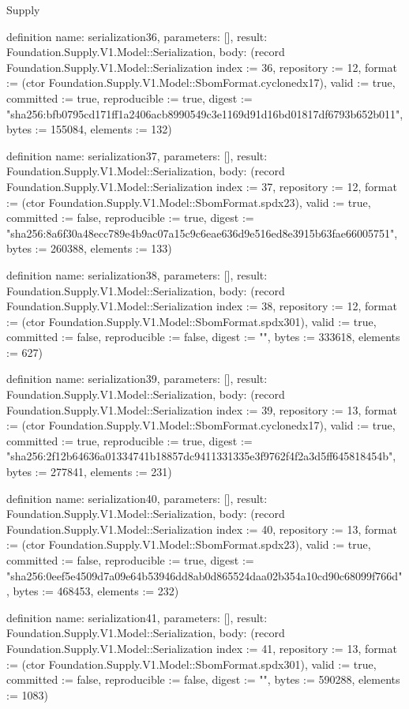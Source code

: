 \begin{lexlean}{Supply}
\begin{semanticmodule}
definition{
  name: serialization36,
  parameters: [],
  result: Foundation.Supply.V1.Model::Serialization,
  body: (record Foundation.Supply.V1.Model::Serialization {index := 36, repository := 12, format := (ctor Foundation.Supply.V1.Model::SbomFormat.cyclonedx17), valid := true, committed := true, reproducible := true, digest := "sha256:bfb0795cd171ff1a2406acb8990549c3e1169d91d16bd01817df6793b652b011", bytes := 155084, elements := 132})
}

definition{
  name: serialization37,
  parameters: [],
  result: Foundation.Supply.V1.Model::Serialization,
  body: (record Foundation.Supply.V1.Model::Serialization {index := 37, repository := 12, format := (ctor Foundation.Supply.V1.Model::SbomFormat.spdx23), valid := true, committed := false, reproducible := true, digest := "sha256:8a6f30a48ecc789e4b9ac07a15c9c6eae636d9e516ed8e3915b63fae66005751", bytes := 260388, elements := 133})
}

definition{
  name: serialization38,
  parameters: [],
  result: Foundation.Supply.V1.Model::Serialization,
  body: (record Foundation.Supply.V1.Model::Serialization {index := 38, repository := 12, format := (ctor Foundation.Supply.V1.Model::SbomFormat.spdx301), valid := true, committed := false, reproducible := false, digest := "", bytes := 333618, elements := 627})
}

definition{
  name: serialization39,
  parameters: [],
  result: Foundation.Supply.V1.Model::Serialization,
  body: (record Foundation.Supply.V1.Model::Serialization {index := 39, repository := 13, format := (ctor Foundation.Supply.V1.Model::SbomFormat.cyclonedx17), valid := true, committed := true, reproducible := true, digest := "sha256:2f12b64636a01334741b18857dc9411331335e3f9762f4f2a3d5ff645818454b", bytes := 277841, elements := 231})
}

definition{
  name: serialization40,
  parameters: [],
  result: Foundation.Supply.V1.Model::Serialization,
  body: (record Foundation.Supply.V1.Model::Serialization {index := 40, repository := 13, format := (ctor Foundation.Supply.V1.Model::SbomFormat.spdx23), valid := true, committed := false, reproducible := true, digest := "sha256:0eef5e4509d7a09e64b53946dd8ab0d865524daa02b354a10cd90c68099f766d", bytes := 468453, elements := 232})
}

definition{
  name: serialization41,
  parameters: [],
  result: Foundation.Supply.V1.Model::Serialization,
  body: (record Foundation.Supply.V1.Model::Serialization {index := 41, repository := 13, format := (ctor Foundation.Supply.V1.Model::SbomFormat.spdx301), valid := true, committed := false, reproducible := false, digest := "", bytes := 590288, elements := 1083})
}


\end{semanticmodule}
\end{lexlean}
